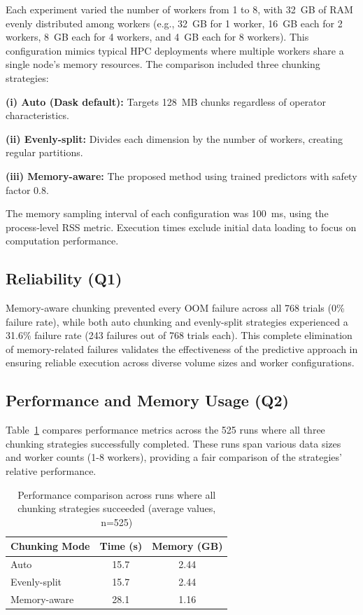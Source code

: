Each experiment varied the number of \dask workers from 1 to 8, with 32~GB of \ac{RAM} evenly distributed among workers (e.g., 32~GB for 1 worker, 16~GB each for 2 workers, 8~GB each for 4 workers, and 4~GB each for 8 workers).
This configuration mimics typical \ac{HPC} deployments where multiple workers share a single node's memory resources.
The comparison included three chunking strategies:

\textbf{(i) Auto (Dask default):} Targets 128~MB chunks regardless of operator characteristics.

\textbf{(ii) Evenly-split:} Divides each dimension by the number of workers, creating regular partitions.

\textbf{(iii) Memory-aware:} The proposed method using trained predictors with safety factor 0.8.

The memory sampling interval of each configuration was 100~ms, using the process-level \ac{RSS} metric.
Execution times exclude initial data loading to focus on computation performance.

\subsection{Reliability (Q1)}

Memory-aware chunking prevented every \ac{OOM} failure across all 768 trials (0\% failure rate), while both auto chunking and evenly-split strategies experienced a 31.6\% failure rate (243 failures out of 768 trials each).
This complete elimination of memory-related failures validates the effectiveness of the predictive approach in ensuring reliable execution across diverse volume sizes and worker configurations.

\subsection{Performance and Memory Usage (Q2)}

Table~\ref{tab:overall-performance} compares performance metrics across the 525 runs where all three chunking strategies successfully completed.
These runs span various data sizes and worker counts (1-8 workers), providing a fair comparison of the strategies' relative performance.

\begin{table}[htb]
    \centering
    \caption{Performance comparison across runs where all chunking strategies succeeded (average values, n=525)}
    \label{tab:overall-performance}
    \begin{tabular}{lcc}
        \toprule
        \textbf{Chunking Mode} & \textbf{Time (s)} & \textbf{Memory (\ac{GB})} \\
        \midrule
        Auto & 15.7 & 2.44 \\
        Evenly-split & 15.7 & 2.44 \\
        Memory-aware & 28.1 & 1.16 \\
        \bottomrule
    \end{tabular}
\end{table}

